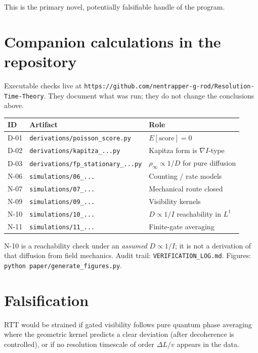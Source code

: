 \documentclass[11pt]{article}
\begin{document}
This is the primary novel, potentially falsifiable handle of the program.

\section{Companion calculations in the repository}

Executable checks live at
\texttt{https://github.com/nentrapper-g-rod/Resolution-Time-Theory}.
They document what was run; they do not change the conclusions above.

\begin{center}
\begin{tabular}{@{}llp{5.8cm}@{}}
\toprule
ID & Artifact & Role \\
\midrule
D-01 & \texttt{derivations/poisson\_score.py} & $E[\mathrm{score}]=0$ \\
D-02 & \texttt{derivations/kapitza\_...py} & Kapitza form is $\nabla I$-type \\
D-03 & \texttt{derivations/fp\_stationary\_...py} & $\rho_\infty\propto 1/D$ for pure diffusion \\
N-06 & \texttt{simulations/06\_...} & Counting / rate models \\
N-07 & \texttt{simulations/07\_...} & Mechanical route closed \\
N-09 & \texttt{simulations/09\_...} & Visibility kernels \\
N-10 & \texttt{simulations/10\_...} & $D\propto 1/I$ reachability in $L^1$ \\
N-11 & \texttt{simulations/11\_...} & Finite-gate averaging \\
\bottomrule
\end{tabular}
\end{center}

N-10 is a reachability check under an \emph{assumed} $D\propto 1/I$; it is not a derivation of that diffusion from field mechanics.
Audit trail: \texttt{VERIFICATION\_LOG.md}. Figures: \texttt{python paper/generate\_figures.py}.

\section{Falsification}

RTT would be strained if gated visibility follows pure quantum phase averaging where the geometric kernel predicts a clear deviation (after decoherence is controlled), or if no resolution timescale of order $\Delta L/v$ appears in the data.
\end{document}
